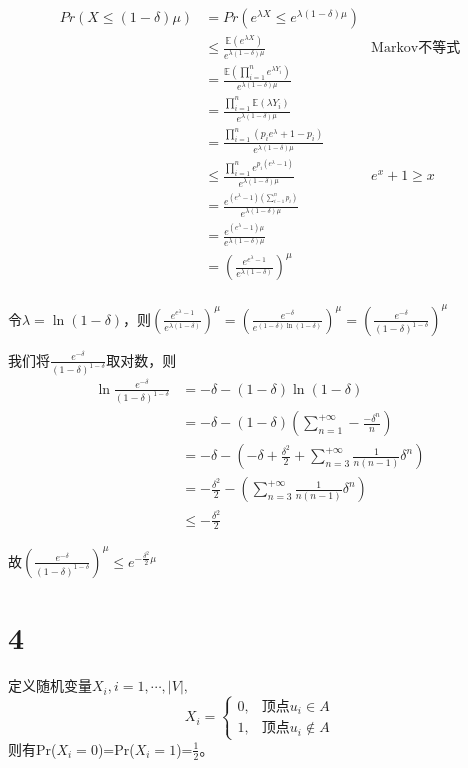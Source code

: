 \documentclass{article}
\begin{document}
\begin{align*}
Pr(X\leq (1-\delta)\mu)&=Pr(e^{\lambda X}\le e^{\lambda (1-\delta)\mu}) \\
& \le \frac{\mathbb{E}(e^{\lambda X})}{e^{\lambda (1-\delta)\mu}} &\text{Markov不等式}\\
& = \frac{\mathbb{E}(\prod_{i=1}^ne^{\lambda Y_i})}{e^{\lambda (1-\delta)\mu}}\\
& = \frac{\prod_{i=1}^n\mathbb{E}(\lambda Y_i)}{e^{\lambda (1-\delta)\mu}}\\
& = \frac{\prod_{i=1}^n(p_ie^{\lambda}+1-p_i)}{e^{\lambda (1-\delta)\mu}}\\
& \le \frac{\prod_{i=1}^ne^{p_i(e^\lambda-1)}}{e^{\lambda (1-\delta)\mu}} & e^x+1\ge x\\
& = \frac{e^{(e^{\lambda}-1)(\sum_{i-1}^np_i)}}{e^{\lambda (1-\delta)\mu}}\\
& = \frac{e^{(e^{\lambda}-1)\mu}}{e^{\lambda (1-\delta)\mu}}\\
& = (\frac{e^{e^{\lambda}-1}}{e^{\lambda (1-\delta)}})^{\mu}\\
\end{align*}

令$\lambda=\ln (1-\delta)$，则$(\frac{e^{e^{\lambda}-1}}{e^{\lambda (1-\delta)}})^{\mu}=(\frac{e^{-\delta}}{e^{(1-\delta)\ln (1-\delta)}})^{\mu}=(\frac{e^{-\delta}}{(1-\delta)^{1-\delta}})^{\mu}
$

我们将$\frac{e^{-\delta}}{(1-\delta)^{1-\delta}}$取对数，则
\begin{align*}
\ln \frac{e^{-\delta}}{(1-\delta)^{1-\delta}}&=-\delta-(1-\delta)\ln (1-\delta)\\
&=-\delta - (1-\delta)(\sum_{n=1}^{+\infty}-\frac{-\delta^n}{n})\\
&=-\delta - (-\delta+\frac{\delta^2}{2}+\sum_{n=3}^{+\infty}\frac{1}{n(n-1)}\delta^n)\\
&=-\frac{\delta^2}{2}-(\sum_{n=3}^{+\infty}\frac{1}{n(n-1)}\delta^n)\\
& \le -\frac{\delta^2}{2}
\end{align*}

故$(\frac{e^{-\delta}}{(1-\delta)^{1-\delta}})^{\mu}\le e^{-\frac{\delta^2}{2}\mu}$

\clearpage

\section*{4}
定义随机变量$X_i,i=1,\cdots,|V|,$
\begin{equation*}
X_i=
\begin{cases}
0, &\text{顶点$u_i \in A$}\\
1, &\text{顶点$u_i \notin A$}
\end{cases}
\end{equation*}
则有Pr($X_i=0$)=Pr($X_i=1$)=$\frac{1}{2}$。
\end{document}
